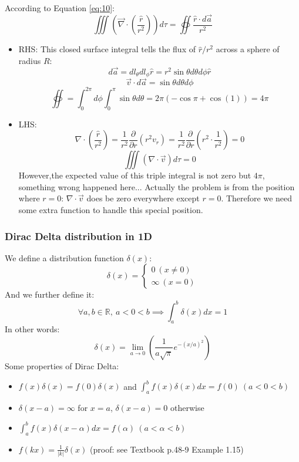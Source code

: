 \documentclass[12pt,a4paper,twoside]{article}
\begin{document}
	\noindent According to Equation \ref{eq:10}:
	\[\iiint (\overrightarrow{\nabla}\cdot (\frac{\hat{r}}{r^2}))d\tau=\oiint \frac{\hat{r}\cdot d\overrightarrow{a}}{r^2}\]
	
    \begin{itemize}
	    \item RHS: This closed surface integral tells the flux of \(\hat{r}/r^2\) across a sphere of radius $R$:
	    \[d\overrightarrow{a}=dl_\theta dl_\phi \hat{r}=r^2\sin\theta d\theta d\phi \hat{r}\]
	    \[\overrightarrow{v}\cdot d\overrightarrow{a}=\sin\theta d\theta d\phi\]
	    \[\oiint = \int_0^{2\pi}d\phi\int_0^{\pi}\sin\theta d\theta =2\pi(-\cos\pi+\cos (1))=4\pi\]
	    
	    \item LHS:
	    \[\nabla \cdot (\frac{\hat{r}}{r^2})=\frac{1}{r^2}\frac{\partial}{\partial r}(r^2v_r)=\frac{1}{r^2}\frac{\partial}{\partial r}(r^2\cdot\frac{1}{r^2})=0\]
	    \[\iiint (\nabla\cdot \overrightarrow{v})d\tau = 0\]
	    However,the expected value of this triple integral is not zero but $4\pi$, something wrong happened here... Actually the problem is from the position where $r=0$: $\nabla\cdot\overrightarrow{v}$ does be zero everywhere except $r=0$. Therefore we need some extra function to handle this special position.
	\end{itemize}
	
	\subsubsection{Dirac Delta distribution in 1D}
	We define a distribution function $\delta(x)$:
	\begin{equation}
	    \delta(x)=\left\{\begin{matrix}
        0\ (x\neq 0)\\ 
        \infty\ (x=0)
    \end{matrix}\right.
	\end{equation}
	And we further define it:
	\[\forall a,b\in \mathbb{R},\ a<0<b\implies  \int_{a}^{b}\delta(x)dx=1\]
	In other words:
	\[\delta(x)=\lim_{a\to 0}\left(\frac{1}{a\sqrt{\pi}}e^{-(x/a)^2}\right)\]
	Some properties of Dirac Delta:
	\begin{itemize}
	    \item \(f(x)\delta(x)=f(0)\delta(x)\) and \(\int_a^bf(x)\delta(x)dx=f(0)\ (a<0<b)\)
	    \item \(\delta(x-a)=\infty\) for $x=a$, \(\delta(x-a)=0\) otherwise
	    \item \(\int_a^bf(x)\delta(x-\alpha)dx=f(\alpha)\ (a<\alpha<b)\)
	    \item \(f(kx)=\frac{1}{|k|}\delta(x)\) (proof: see Textbook p.48-9 Example 1.15)
	\end{itemize}
	
\end{document}
